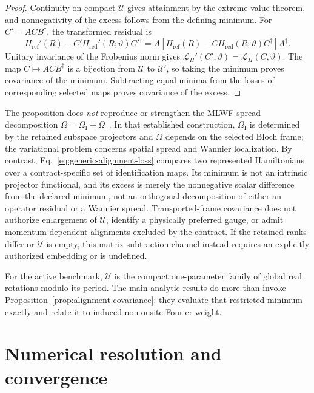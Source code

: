 \documentclass[11pt]{article}
\begin{document}
\begin{proof}
Continuity on compact $\mathcal U$ gives attainment by the extreme-value theorem, and
nonnegativity of the excess follows from the defining minimum. For
$C'=ACB^\dagger$, the transformed residual is
\begin{equation}
 H_{\mathrm{ref}}'(R)-C'H_{\mathrm{red}}'(R;\vartheta)C'^\dagger
 =A\left[H_{\mathrm{ref}}(R)
 -CH_{\mathrm{red}}(R;\vartheta)C^\dagger\right]A^\dagger.
\end{equation}
Unitary invariance of the Frobenius norm gives
$\mathcal L_H'(C',\vartheta)=\mathcal L_H(C,\vartheta)$. The map
$C\mapsto ACB^\dagger$ is a bijection from $\mathcal U$ to $\mathcal U'$, so taking the
minimum proves covariance of the minimum. Subtracting equal minima from the losses of
corresponding selected maps proves covariance of the excess.
\end{proof}

The proposition does \emph{not} reproduce or strengthen the MLWF spread decomposition
$\Omega=\Omega_{\mathrm I}+\widetilde\Omega$~\cite{marzari1997,marzari2012}. In that
established construction, $\Omega_{\mathrm I}$ is determined by the retained subspace
projectors and $\widetilde\Omega$ depends on the selected Bloch frame; the variational
problem concerns spatial spread and Wannier localization. By contrast,
Eq.~\eqref{eq:generic-alignment-loss} compares two represented Hamiltonians over a
contract-specific set of identification maps. Its minimum is not an intrinsic
projector functional, and its excess is merely the nonnegative scalar difference from
the declared minimum, not an orthogonal decomposition of either an operator residual or
a Wannier spread. Transported-frame covariance does not authorize enlargement of
$\mathcal U$, identify a physically preferred gauge, or admit momentum-dependent
alignments excluded by the contract. If the retained ranks differ or $\mathcal U$ is
empty, this matrix-subtraction channel instead requires an explicitly authorized
embedding or is undefined.

For the active benchmark, $\mathcal U$ is the compact one-parameter family of global
real rotations modulo its period. The main analytic results do more than invoke
Proposition~\ref{prop:alignment-covariance}: they evaluate that restricted minimum
exactly and relate it to induced non-onsite Fourier weight.

\section{Numerical resolution and convergence}
\end{document}

